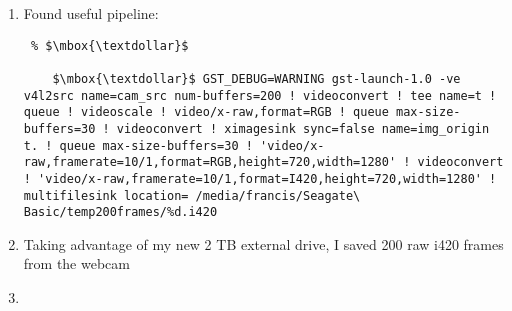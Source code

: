\documentclass[12pt,oneside]{book}
\begin{document}
\begin{enumerate}
\begin{lstlisting}
    $\mbox{\textdollar}$ gst-inspect-1.0 v4l2src
      video/x-raw
        format: { (string)RGB16, (string)BGR, (string)RGB, (string)GRAY8, (string)
          GRAY16_LE, (string)GRAY16_BE, (string)YVU9, (string)YV12, (string)YUY2,
          (string)YVYU, (string)UYVY, (string)Y42B, (string)Y41B, (string)YUV9,
          (string)NV12_64Z32, (string)NV24, (string)NV61, (string)NV16, (string)
          NV21, (string)NV12, (string)I420, (string)BGRA, (string)BGRx, (string )
          ARGB, (string)xRGB, (string)BGR15, (string)RGB15 }
    $\mbox{\textdollar}$ gst-inspect-1.0 xvimagesink  
      video/x-raw
        framerate: [ 0/1, 2147483647/1 ]
        width: [ 1, 2147483647 ]
        height: [ 1, 2147483647 ]
      \end{lstlisting}
  \item Found useful pipeline:
  \begin{lstlisting} % $\mbox{\textdollar}$

    $\mbox{\textdollar}$ GST_DEBUG=WARNING gst-launch-1.0 -ve v4l2src name=cam_src num-buffers=200 ! videoconvert ! tee name=t ! queue ! videoscale ! video/x-raw,format=RGB ! queue max-size-buffers=30 ! videoconvert ! ximagesink sync=false name=img_origin t. ! queue max-size-buffers=30 ! 'video/x-raw,framerate=10/1,format=RGB,height=720,width=1280' ! videoconvert ! 'video/x-raw,framerate=10/1,format=I420,height=720,width=1280' ! multifilesink location= /media/francis/Seagate\ Basic/temp200frames/%d.i420
  \end{lstlisting}
  \item Taking advantage of my new 2 TB external drive, I saved 200 raw i420 frames from the webcam
  \item 
\end{enumerate}


  \printbibliography[title={Bibliografía},heading=bibintoc]
\end{document}
